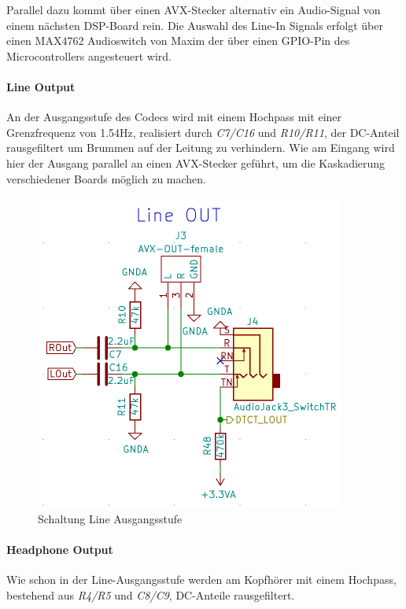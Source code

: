 Parallel dazu kommt über einen AVX-Stecker alternativ ein Audio-Signal von einem nächsten DSP-Board rein. Die Auswahl des Line-In Signals erfolgt über einen MAX4762 \cite{max4762} Audioswitch von Maxim der über einen GPIO-Pin des Microcontrollers angesteuert wird. 

\paragraph{Line Output}
\label{par:LineOUT}
An der Ausgangsstufe des Codecs wird mit einem Hochpass mit einer Grenzfrequenz von 1.54Hz, realisiert durch \textit{C7/C16} und \textit{R10/R11}, der DC-Anteil rausgefiltert um Brummen auf der Leitung zu verhindern.
Wie am Eingang wird hier der Ausgang parallel an einen AVX-Stecker geführt, um die Kaskadierung verschiedener Boards möglich zu machen.


\begin{figure} [H]
\begin{center}
 \includegraphics[scale=0.5]{../graphics/Schema_LineOUT.png}
\caption{Schaltung Line Ausgangsstufe}
\label{fig:Schema_LineOUT}
\end{center}
\end{figure}


\paragraph{Headphone Output}
\label{par:HPOUT}
Wie schon in der Line-Ausgangsstufe werden am Kopfhörer mit einem Hochpass, bestehend aus \textit{R4/R5} und \textit{C8/C9}, DC-Anteile rausgefiltert.

